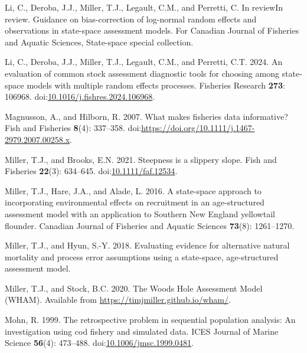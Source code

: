 \documentclass[
  12pt,
]{article}
\newlength{\cslhangindent}
\newlength{\cslentryspacingunit} %
\newenvironment{CSLReferences}[2] %
 {%
  \setlength{\parindent}{0pt}
  \ifodd #1
  \let\oldpar\par
  \def\par{\hangindent=\cslhangindent\oldpar}
  \fi
  \setlength{\parskip}{#2\cslentryspacingunit}
 }%
 {}
\begin{document}
\begin{CSLReferences}{1}{0}
\leavevmode{}%
Li, C., Deroba, J.J., Miller, T.J., Legault, C.M., and Perretti, C. In
reviewIn review. Guidance on bias-correction of log-normal random
effects and observations in state-space assessment models. For Canadian
Journal of Fisheries and Aquatic Sciences, State-space special
collection.

\leavevmode{}%
Li, C., Deroba, J.J., Miller, T.J., Legault, C.M., and Perretti, C.T.
2024. An evaluation of common stock assessment diagnostic tools for
choosing among state-space models with multiple random effects
processes. Fisheries Research \textbf{273}: 106968.
doi:\href{https://doi.org/10.1016/j.fishres.2024.106968}{10.1016/j.fishres.2024.106968}.

\leavevmode{}%
Magnusson, A., and Hilborn, R. 2007. What makes fisheries data
informative? Fish and Fisheries \textbf{8}(4): 337--358.
doi:\url{https://doi.org/10.1111/j.1467-2979.2007.00258.x}.

\leavevmode{}%
Miller, T.J., and Brooks, E.N. 2021. Steepness is a slippery slope. Fish
and Fisheries \textbf{22}(3): 634--645.
doi:\href{https://doi.org/10.1111/faf.12534}{10.1111/faf.12534}.

\leavevmode{}%
Miller, T.J., Hare, J.A., and Alade, L. 2016. A state-space approach to
incorporating environmental effects on recruitment in an age-structured
assessment model with an application to {S}outhern {N}ew {E}ngland
yellowtail flounder. Canadian Journal of Fisheries and Aquatic Sciences
\textbf{73}(8): 1261--1270.

\leavevmode{}%
Miller, T.J., and Hyun, S.-Y. 2018. Evaluating evidence for alternative
natural mortality and process error assumptions using a state-space,
age-structured assessment model.

\leavevmode{}%
Miller, T.J., and Stock, B.C. 2020. The {Woods Hole Assessment Model}
({WHAM}). Available from \url{https://timjmiller.github.io/wham/}.

\leavevmode{}%
Mohn, R. 1999. The retrospective problem in sequential population
analysis: An investigation using cod fishery and simulated data. ICES
Journal of Marine Science \textbf{56}(4): 473--488.
doi:\href{https://doi.org/10.1006/jmsc.1999.0481}{10.1006/jmsc.1999.0481}.


\end{CSLReferences}
\end{document}
